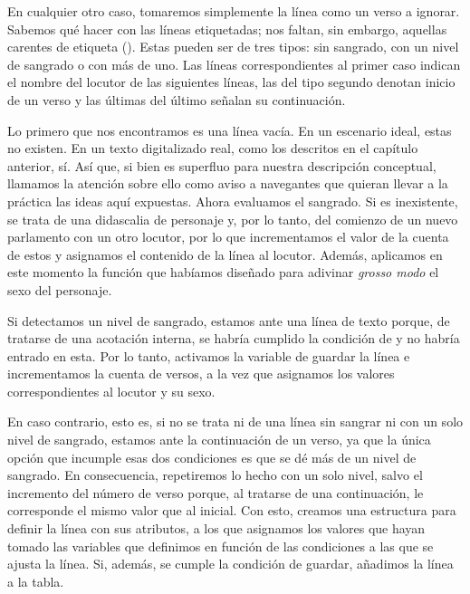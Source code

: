 En cualquier otro caso, tomaremos simplemente la línea como un verso a ignorar. Sabemos qué hacer con las líneas etiquetadas; nos faltan, sin embargo, aquellas carentes de etiqueta (). Estas pueden ser de tres tipos: sin sangrado, con un nivel de sangrado o con más de uno. Las líneas correspondientes al primer caso indican el nombre del locutor de las siguientes líneas, las del tipo segundo denotan inicio de un verso y las últimas del último señalan su continuación.

Lo primero que nos encontramos es una línea vacía. En un escenario ideal, estas no existen. En un texto digitalizado real, como los descritos en el capítulo anterior, sí. Así que, si bien es superfluo para nuestra descripción conceptual, llamamos la atención sobre ello como aviso a navegantes que quieran llevar a la práctica las ideas aquí expuestas. Ahora evaluamos el sangrado. Si es inexistente, se trata de una didascalia de personaje y, por lo tanto, del comienzo de un nuevo parlamento con un otro locutor, por lo que incrementamos el valor de la cuenta de estos y asignamos el contenido de la línea al locutor. Además, aplicamos en este momento la función que habíamos diseñado para adivinar \textit{grosso modo} el sexo del personaje.

Si detectamos un nivel de sangrado, estamos ante una línea de texto porque, de tratarse de una acotación interna, se habría cumplido la condición de  y no habría entrado en esta. Por lo tanto, activamos la variable de guardar la línea e incrementamos la cuenta de versos, a la vez que asignamos los valores correspondientes al locutor y su sexo.



En caso contrario, esto es, si no se trata ni de una línea sin sangrar ni con un solo nivel de sangrado, estamos ante la continuación de un verso, ya que la única opción que incumple esas dos condiciones es que se dé más de un nivel de sangrado. En consecuencia, repetiremos lo hecho con un solo nivel, salvo el incremento del número de verso porque, al tratarse de una continuación, le corresponde el mismo valor que al inicial. Con esto, creamos una estructura para definir la línea con sus atributos, a los que asignamos los valores que hayan tomado las variables que definimos en función de las condiciones a las que se ajusta la línea. Si, además, se cumple la condición de guardar, añadimos la línea a la tabla.


